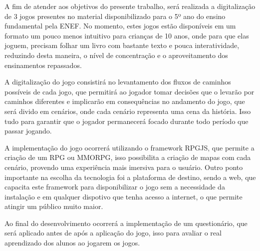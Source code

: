         A fim de atender aos objetivos do presente trabalho, será realizada a digitalização de 3 jogos presentes no
        material disponibilizado para o 5º ano do ensino fundamental pela ENEF. No momento, estes jogos estão
        disponíveis em um formato um pouco menos intuitivo para crianças de 10 anos, onde para que elas joguem, precisam
        folhar um livro com bastante texto e pouca interatividade, reduzindo desta maneira, o nível de concentração e o
        aproveitamento dos ensinamentos repassados.

        A digitalização do jogo consistirá no levantamento dos fluxos de caminhos possíveis de cada jogo, que permitirá
        ao jogador tomar decisões que o levarão por caminhos diferentes e implicarão em consequências no andamento do
        jogo, que será divido em cenários, onde cada cenário representa uma cena da história. Isso tudo para garantir
        que o jogador permanecerá focado durante todo período que passar jogando.

        A implementação do jogo ocorrerá utilizando o framework RPGJS, que permite a criação de um RPG ou MMORPG, isso
        possibilita a criação de mapas com cada cenário, provendo uma experiência mais imersiva para o usuário.
        Outro ponto importante na escolha da tecnologia foi a plataforma de destino, sendo a web, que capacita este
        framework para disponibilizar o jogo sem a necessidade da instalação e em qualquer dispotivo que tenha acesso
        a internet, o que permite atingir um público muito maior.

        Ao final do desenvolvimento ocorrerá a implementação de um questionário, que será aplicado antes de após a
        aplicação do jogo, isso para avaliar o real aprendizado dos alunos ao jogarem os jogos.
